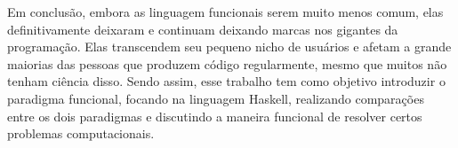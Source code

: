 Em conclusão, embora as linguagem funcionais serem muito menos comum, elas definitivamente deixaram e continuam deixando marcas nos gigantes da programação.
Elas transcendem seu pequeno nicho de usuários e afetam a grande maiorias das pessoas que produzem código regularmente, mesmo que muitos não tenham ciência disso.
Sendo assim, esse trabalho tem como objetivo introduzir o paradigma funcional, focando na linguagem Haskell, realizando comparações entre os dois paradigmas e discutindo a maneira funcional de resolver certos problemas computacionais.


